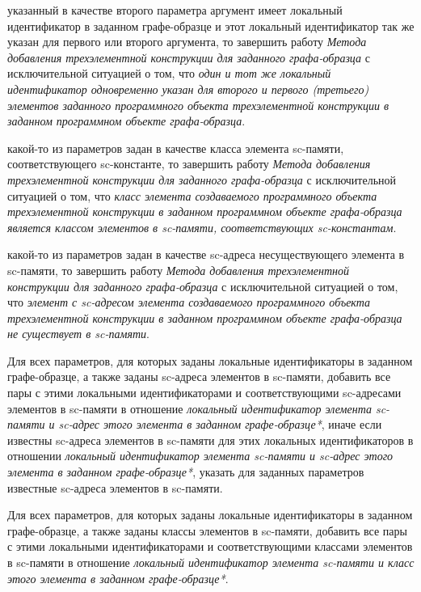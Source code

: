 \begin{textitemize}
	\item {} указанный в качестве второго параметра аргумент имеет локальный идентификатор в заданном графе-образце и этот локальный идентификатор так же указан для первого или второго аргумента, то завершить работу \textit{Метода добавления трехэлементной конструкции для заданного графа-образца} с исключительной ситуацией о том, что \textit{один и тот же локальный идентификатор одновременно указан для второго и первого (третьего) элементов заданного программного объекта трехэлементной конструкции в заданном программном объекте графа-образца}.
	\item {} какой-то из параметров задан в качестве класса элемента sc-памяти, соответствующего sc-константе, то завершить работу \textit{Метода добавления трехэлементной конструкции для заданного графа-образца} с исключительной ситуацией о том, что \textit{класс элемента создаваемого программного объекта трехэлементной конструкции в заданном программном объекте графа-образца является классом элементов в sc-памяти, соответствующих sc-константам}.
	\item {} какой-то из параметров задан в качестве sc-адреса несуществующего элемента в sc-памяти, то завершить работу \textit{Метода добавления трехэлементной конструкции для заданного графа-образца} с исключительной ситуацией о том, что \textit{элемент с sc-адресом элемента создаваемого программного объекта трехэлементной конструкции в заданном программном объекте графа-образца не существует в sc-памяти}.
	\item Для всех параметров, для которых заданы локальные идентификаторы в заданном графе-образце, а также заданы sc-адреса элементов в sc-памяти, добавить все пары с этими локальными идентификаторами и соответствующими sc-адресами элементов в sc-памяти в отношение \textit{локальный идентификатор элемента sc-памяти и sc-адрес этого элемента в заданном графе-образце*}, иначе если известны sc-адреса элементов в sc-памяти для этих локальных идентификаторов в отношении \textit{локальный идентификатор элемента sc-памяти и sc-адрес этого элемента в заданном графе-образце*}, указать для заданных параметров известные sc-адреса элементов в sc-памяти.
	\item Для всех параметров, для которых заданы локальные идентификаторы в заданном графе-образце, а также заданы классы элементов в sc-памяти, добавить все пары с этими локальными идентификаторами и соответствующими классами элементов в sc-памяти в отношение \textit{локальный идентификатор элемента sc-памяти и класс этого элемента в заданном графе-образце*}.

\end{textitemize}
